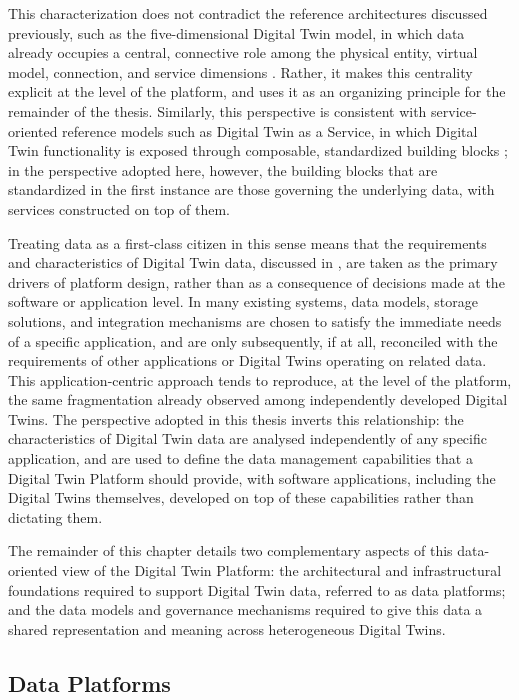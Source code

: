 This characterization does not contradict the reference architectures discussed previously, such as the five-dimensional Digital Twin model, in which data already occupies a central, connective role among the physical entity, virtual model, connection, and service dimensions \cite{qi2021,tao2022}. Rather, it makes this centrality explicit at the level of the platform, and uses it as an organizing principle for the remainder of the thesis. Similarly, this perspective is consistent with service-oriented reference models such as Digital Twin as a Service, in which Digital Twin functionality is exposed through composable, standardized building blocks \cite{AHELEROFF2021101225}; in the perspective adopted here, however, the building blocks that are standardized in the first instance are those governing the underlying data, with services constructed on top of them.

Treating data as a first-class citizen in this sense means that the requirements and characteristics of Digital Twin data, discussed in , are taken as the primary drivers of platform design, rather than as a consequence of decisions made at the software or application level. In many existing systems, data models, storage solutions, and integration mechanisms are chosen to satisfy the immediate needs of a specific application, and are only subsequently, if at all, reconciled with the requirements of other applications or Digital Twins operating on related data. This application-centric approach tends to reproduce, at the level of the platform, the same fragmentation already observed among independently developed Digital Twins. The perspective adopted in this thesis inverts this relationship: the characteristics of Digital Twin data are analysed independently of any specific application, and are used to define the data management capabilities that a Digital Twin Platform should provide, with software applications, including the Digital Twins themselves, developed on top of these capabilities rather than dictating them.

The remainder of this chapter details two complementary aspects of this data-oriented view of the Digital Twin Platform: the architectural and infrastructural foundations required to support Digital Twin data, referred to as data platforms; and the data models and governance mechanisms required to give this data a shared representation and meaning across heterogeneous Digital Twins.

\subsection{Data Platforms}

